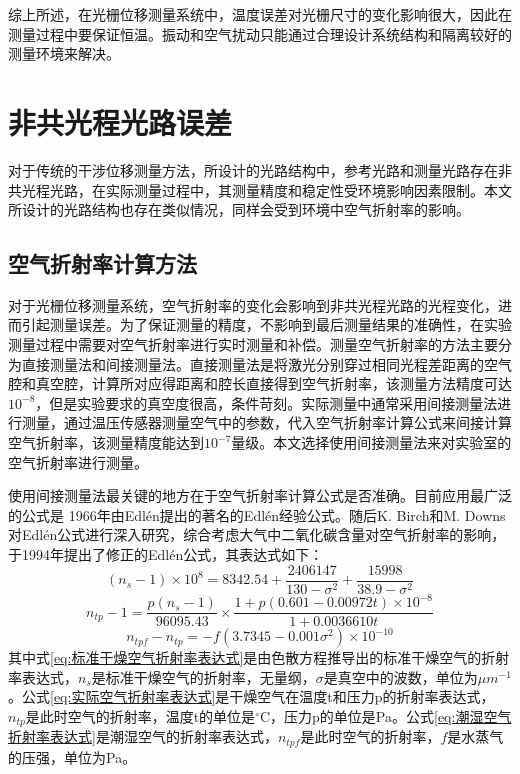 \documentclass[type=master,oneside]{fduthesis}
\begin{document}
综上所述，在光栅位移测量系统中，温度误差对光栅尺寸的变化影响很大，因此在测量过程中要保证恒温。振动和空气扰动只能通过合理设计系统结构和隔离较好的测量环境来解决。

\section{非共光程光路误差}
对于传统的干涉位移测量方法，所设计的光路结构中，参考光路和测量光路存在非共光程光路，在实际测量过程中，其测量精度和稳定性受环境影响因素限制。本文所设计的光路结构也存在类似情况，同样会受到环境中空气折射率的影响。

\subsection{空气折射率计算方法}
对于光栅位移测量系统，空气折射率的变化会影响到非共光程光路的光程变化，进而引起测量误差。为了保证测量的精度，不影响到最后测量结果的准确性，在实验测量过程中需要对空气折射率进行实时测量和补偿。测量空气折射率的方法主要分为直接测量法和间接测量法。直接测量法\cite{李东光2000真空腔测量空气折射率的方法及精度分析,minoshima2011high,fang2002heterodyne}是将激光分别穿过相同光程差距离的空气腔和真空腔，计算所对应得距离和腔长直接得到空气折射率，该测量方法精度可达$10^{-8}$，但是实验要求的真空度很高，条件苛刻。实际测量中通常采用间接测量法进行测量，通过温压传感器测量空气中的参数，代入空气折射率计算公式来间接计算空气折射率\cite{yazdani2014application,tualle2003derivation,ferwerda1999radiative}，该测量精度能达到$10^{-7}$量级。本文选择使用间接测量法来对实验室的空气折射率进行测量。

使用间接测量法最关键的地方在于空气折射率计算公式是否准确。目前应用最广泛的公式是
1966年由Edlén提出的著名的Edlén经验公式\cite{edlen1966refractive}。随后K. Birch和M. Downs 对Edlén公式进行深入研究，综合考虑大气中二氧化碳含量\cite{birch1988results,birch1993effect,birch1993updated}对空气折射率的影响，于1994年提出了修正的Edlén公式\cite{birch1994correction}，其表达式如下：
\begin{equation}
  \left(n_{s}-1\right) \times 10^{8}=8342.54+\frac{2406147}{130-\sigma^{2}}+\frac{15998}{38.9-\sigma^{2}}
  \label{eq:标准干燥空气折射率表达式}
\end{equation}
\begin{equation}
  n_{t p}-1=\frac{p\left(n_{s}-1\right)}{96095.43} \times \frac{1+p(0.601-0.00972 t) \times 10^{-8}}{1+0.0036610 t}
  \label{eq:实际空气折射率表达式}
\end{equation}
\begin{equation}
  n_{t p f}-n_{t p}=-f\left(3.7345-0.001 \sigma^{2}\right) \times 10^{-10}
  \label{eq:潮湿空气折射率表达式}
\end{equation}
其中式\ref{eq:标准干燥空气折射率表达式}是由色散方程推导出的标准干燥空气的折射率表达式，$n_{s}$是标准干燥空气的折射率，无量纲，$\sigma$是真空中的波数，单位为$\mu m^{-1}$。公式\ref{eq:实际空气折射率表达式}是干燥空气在温度t和压力p的折射率表达式，$n_{t p}$是此时空气的折射率，温度t的单位是${ }^{\circ} \mathrm{C}$，压力p的单位是Pa。公式\ref{eq:潮湿空气折射率表达式}是潮湿空气的折射率表达式，$n_{t p f}$是此时空气的折射率，$f$是水蒸气的压强，单位为Pa。
\end{document}
